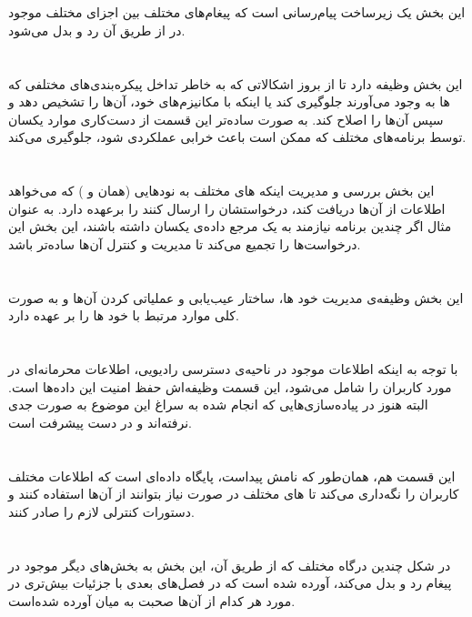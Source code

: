 \section{}
این بخش یک زیرساخت پیام‌رسانی است که پیغام‌های مختلف بین اجزای مختلف موجود در
از طریق آن رد و بدل می‌شود. 

\section{}
این بخش وظیفه دارد تا از بروز اشکالاتی که به خاطر تداخل پیکره‌بندی‌های مختلفی که 
ها
به وجود می‌آورند جلوگیری کند یا اینکه با مکانیزم‌های خود، آن‌ها را تشخیص دهد و سپس آن‌ها را اصلاح کند. به صورت ساده‌تر این قسمت از دست‌کاری موارد یکسان توسط برنامه‌های مختلف که ممکن است باعث خرابی عملکردی شود، جلوگیری می‌کند.

\section{}
این بخش بررسی و مدیریت اینکه
های
مختلف به 
نودهایی (همان 
و
)
که می‌خواهد اطلاعات از آن‌ها دریافت کند، درخواستشان را ارسال کنند را برعهده دارد. به عنوان مثال اگر چندین برنامه نیازمند به یک مرجع داده‌ی یکسان داشته باشند، این بخش این درخواست‌ها را تجمیع می‌کند تا مدیریت و کنترل‌ آن‌ها ساده‌تر باشد.

\section{}
این بخش وظیفه‌ی مدیریت خود
ها،
ساختار عیب‌یابی و عملیاتی کردن آن‌ها و به صورت کلی موارد مرتبط با خود 
ها
را بر عهده دارد.

\section{}
 با توجه به اینکه اطلاعات موجود در ناحیه‌ی دسترسی رادیویی، اطلاعات محرمانه‌ای در مورد کاربران را شامل می‌شود، این قسمت وظیفه‌اش حفظ امنیت این داده‌ها است. البته هنوز در پیاده‌سازی‌هایی که انجام شده به سراغ این موضوع به صورت جدی نرفته‌اند و در دست پیشرفت است.
 
\section{}
 این قسمت هم، همان‌طور که نامش پیداست،‌ پایگاه داده‌ای است که اطلاعات مختلف کاربران را نگه‌داری می‌کند تا 
 های
 مختلف در صورت نیاز بتوانند از آن‌ها استفاده کنند و دستورات کنترلی لازم را صادر کنند.
 
 
\section{}
در شکل چندین درگاه مختلف که از طریق آن، این بخش
به بخش‌های دیگر موجود در 
پیغام رد و بدل می‌کند،‌ آورده شده است که در فصل‌های بعدی با جزئیات بیش‌تری در مورد هر کدام از آن‌ها صحبت به میان آورده شده‌است.


 